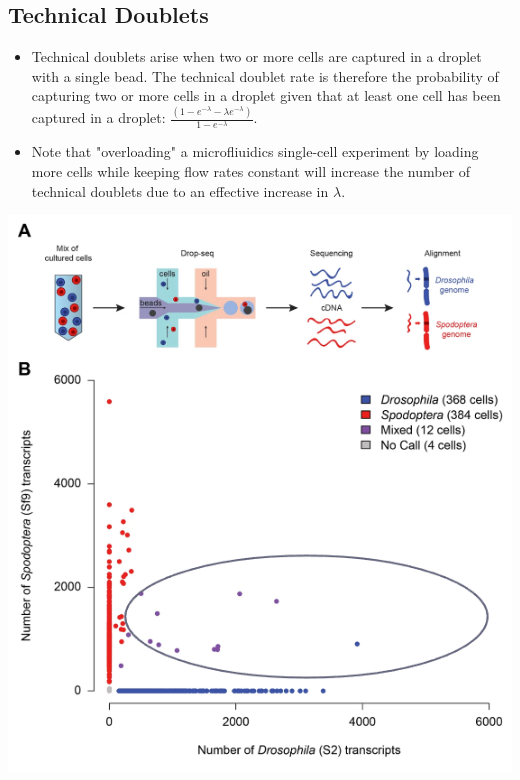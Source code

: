 \documentclass[10pt]{article}
\begin{document}
\subsection*{Technical Doublets}
\begin{itemize}
    \item Technical doublets arise when two or more cells are captured in a droplet with a single bead.  The technical doublet rate is therefore the probability of capturing two or more cells in a droplet given that at least one cell has been captured in a droplet: $\frac{(1 - e^{-\lambda} - \lambda e^{-\lambda})}{1 - e^{-\lambda}}$.
    \item Note that "overloading" a microfliuidics single-cell experiment by loading more cells while keeping flow rates constant will increase the number of technical doublets due to an effective increase in $\lambda$.
\end{itemize}
\begin{center}
    \includegraphics*[scale=0.8]{W7_5.png}
\end{center}
\end{document}
